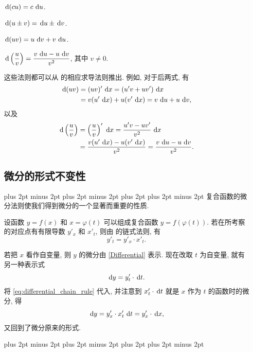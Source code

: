 \label{rule:differential_constant_multiple}
$\,\mathrm{d}(cu)=c\,\,\mathrm{d} u$.

\label{rule:differential_sum_difference}
$\,\mathrm{d}(u\pm v)=\,\mathrm{d} u\pm\,\mathrm{d} v$.

\label{rule:differential_product}
$\,\mathrm{d}(uv)=u\,\,\mathrm{d} v+v\,\,\mathrm{d} u$.

\label{rule:differential_quotient}
$\displaystyle\,\mathrm{d}\left( \frac uv \right)=\frac{v\,\,\mathrm{d} u-u\,\,\mathrm{d} v}{v^2}$, 其中 $v\neq0$.

这些法则都可以从  的相应求导法则推出.
例如, 对于后两式, 有
$$
\begin{aligned}
\,\mathrm{d}(uv)&=(uv)'\,\,\mathrm{d} x=(u'v+uv')\,\,\mathrm{d} x\\
&=v(u'\,\,\mathrm{d} x)+u(v'\,\,\mathrm{d} x)=v\,\,\mathrm{d} u+u\,\,\mathrm{d} v,
\end{aligned}
$$
以及
$$
\begin{aligned}
\,\mathrm{d}\left( \frac uv \right)
&=\left( \frac uv \right)'\,\,\mathrm{d} x
=\frac{u'v-uv'}{v^2}\,\,\mathrm{d} x\\
&=\frac{v(u'\,\,\mathrm{d} x)-u(v'\,\,\mathrm{d} x)}{v^2}
=\frac{v\,\,\mathrm{d} u-u\,\,\mathrm{d} v}{v^2}.
\end{aligned}
$$

\subsection{微分的形式不变性}\label{subsec:106}
\begingroup
\abovedisplayskip=8pt plus 2pt minus 2pt
\belowdisplayskip=8pt plus 2pt minus 2pt
\abovedisplayshortskip=4pt plus 2pt
\belowdisplayshortskip=4pt plus 2pt minus 2pt
复合函数的微分法则使我们得到微分的一个显著而重要的性质.

设函数 $y=f(x)$ 和 $x=\varphi(t)$ 可以组成复合函数 $y=f(\varphi(t))$.
若在所考察的对应点有有限导数 $y'_x$ 和 $x'_t$,
则由  的链式法则, 有
\begin{equation}\label{eq:differential_chain_rule}
y'_t=y'_x\cdot x'_t.
\end{equation}

若把 $x$ 看作自变量, 则 $y$ 的微分由 \eqref{Differential} 表示.
现在改取 $t$ 为自变量, 就有另一种表示式
$$
\,\mathrm{d} y=y'_t\cdot\,\mathrm{d} t.
$$
将 \eqref{eq:differential_chain_rule} 代入, 并注意到 $x'_t\cdot\,\mathrm{d} t$
就是 $x$ 作为 $t$ 的函数时的微分, 得
$$
\,\mathrm{d} y=y'_x\cdot x'_t\,\,\mathrm{d} t=y'_x\cdot\,\mathrm{d} x,
$$
又回到了微分原来的形式.
\par\endgroup
\begingroup
\abovedisplayskip=8pt plus 2pt minus 2pt
\belowdisplayskip=8pt plus 2pt minus 2pt
\abovedisplayshortskip=4pt plus 2pt
\belowdisplayshortskip=4pt plus 2pt minus 2pt


